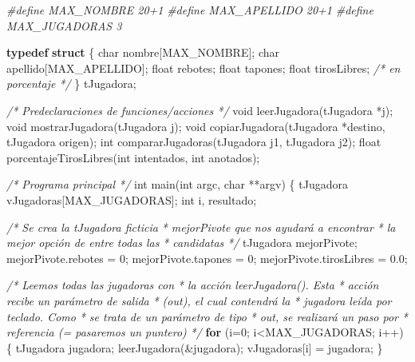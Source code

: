 \documentclass[
]{book}
\newenvironment{Shaded}{\begin{snugshade}}{\end{snugshade}}
\newcommand{\CommentTok}[1]{\textcolor[rgb]{0.56,0.35,0.01}{\textit{#1}}}
\newcommand{\ControlFlowTok}[1]{\textcolor[rgb]{0.13,0.29,0.53}{\textbf{#1}}}
\newcommand{\DataTypeTok}[1]{\textcolor[rgb]{0.13,0.29,0.53}{#1}}
\newcommand{\DecValTok}[1]{\textcolor[rgb]{0.00,0.00,0.81}{#1}}
\newcommand{\FloatTok}[1]{\textcolor[rgb]{0.00,0.00,0.81}{#1}}
\newcommand{\KeywordTok}[1]{\textcolor[rgb]{0.13,0.29,0.53}{\textbf{#1}}}
\newcommand{\NormalTok}[1]{#1}
\newcommand{\PreprocessorTok}[1]{\textcolor[rgb]{0.56,0.35,0.01}{\textit{#1}}}
\begin{document}
\begin{Shaded}
\begin{Highlighting}[]
\PreprocessorTok{\#define MAX\_NOMBRE 20+1}
\PreprocessorTok{\#define MAX\_APELLIDO 20+1}
\PreprocessorTok{\#define MAX\_JUGADORAS 3}

\KeywordTok{typedef} \KeywordTok{struct}\NormalTok{ \{}
    \DataTypeTok{char}\NormalTok{ nombre[MAX\_NOMBRE];}
    \DataTypeTok{char}\NormalTok{ apellido[MAX\_APELLIDO];}
    \DataTypeTok{float}\NormalTok{ rebotes;}
    \DataTypeTok{float}\NormalTok{ tapones;}
    \DataTypeTok{float}\NormalTok{ tirosLibres; }\CommentTok{/* en porcentaje */}
\NormalTok{\} tJugadora;}

\CommentTok{/* Predeclaraciones de funciones/acciones */}
\DataTypeTok{void}\NormalTok{ leerJugadora(tJugadora *j);}
\DataTypeTok{void}\NormalTok{ mostrarJugadora(tJugadora j);}
\DataTypeTok{void}\NormalTok{ copiarJugadora(tJugadora *destino, tJugadora origen);}
\DataTypeTok{int}\NormalTok{ compararJugadoras(tJugadora j1, tJugadora j2);}
\DataTypeTok{float}\NormalTok{ porcentajeTirosLibres(}\DataTypeTok{int}\NormalTok{ intentados, }\DataTypeTok{int}\NormalTok{ anotados);}

\CommentTok{/* Programa principal */}
\DataTypeTok{int}\NormalTok{ main(}\DataTypeTok{int}\NormalTok{ argc, }\DataTypeTok{char}\NormalTok{ **argv) \{}
\NormalTok{    tJugadora vJugadoras[MAX\_JUGADORAS];}
    \DataTypeTok{int}\NormalTok{ i, resultado;}

    \CommentTok{/* Se crea la tJugadora ficticia}
\CommentTok{     * mejorPivote que nos ayudará a encontrar}
\CommentTok{     * la mejor opción de entre todas las}
\CommentTok{     * candidatas}
\CommentTok{     */}
\NormalTok{    tJugadora mejorPivote; }
\NormalTok{    mejorPivote.rebotes = }\DecValTok{0}\NormalTok{;}
\NormalTok{    mejorPivote.tapones = }\DecValTok{0}\NormalTok{;}
\NormalTok{    mejorPivote.tirosLibres = }\FloatTok{0.0}\NormalTok{;}

    \CommentTok{/* Leemos todas las jugadoras con}
\CommentTok{     * la acción leerJugadora(). Esta}
\CommentTok{     * acción recibe un parámetro de salida}
\CommentTok{     * (out), el cual contendrá la}
\CommentTok{     * jugadora leída por teclado. Como}
\CommentTok{     * se trata de un parámetro de tipo}
\CommentTok{     * out, se realizará un paso por}
\CommentTok{     * referencia (= pasaremos un puntero)}
\CommentTok{     */}
    \ControlFlowTok{for}\NormalTok{ (i=}\DecValTok{0}\NormalTok{; i\textless{}MAX\_JUGADORAS; i++) \{}
\NormalTok{        tJugadora jugadora;}
\NormalTok{        leerJugadora(\&jugadora);}
\NormalTok{        vJugadoras[i] = jugadora;}
\NormalTok{    \}}


\end{Highlighting}
\end{Shaded}
\end{document}
